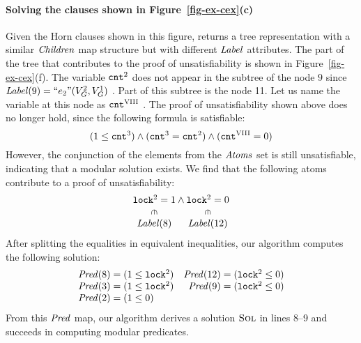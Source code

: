 \paragraph{Solving the clauses shown in Figure~\ref{fig-ex-cex}(c)}
Given the Horn clauses shown in this figure, \algMkHornTree returns a
tree representation with a similar $\mathit{Children}$ map structure but with
different $\mathit{Label}$ attributes.
The part of the tree that contributes to the proof of unsatisfiability
is shown in Figure~\ref{fig-ex-cex}(f).
The variable $\mathtt{cnt}^2$ does not appear in the subtree of the node $9$
since $\cFormulaOf{9}=\unkOf{e_2}(\GlobVars^2,\GlobVars^1)\ $. 
Part of this subtree is the node 11.
Let us name the variable at this node as $\local^{\textsc{VIII}}\ $.
The proof of unsatisfiability shown above does no longer hold, since
the following formula is satisfiable:
\[
 (1\leq\mathtt{cnt}^{3} ) \land (\mathtt{cnt}^{3} = \mathtt{cnt}^{2}) \land (\mathtt{cnt}^{\textsc{VIII}}=0)
\]
However, the conjunction of the elements from the $\mathit{Atoms}$ set is
still unsatisfiable, indicating that a modular solution exists.
We find that the following atoms contribute to a proof of unsatisfiability:
\begin{equation*}
  \begin{array}[t]{@{}c@{}}
      \lock^2=1\\
      \downin\\
      {\cFormulaOf{8}}    
    \end{array}
  \land 
  \begin{array}[t]{@{}c@{}}
      \lock^2=0\\
      \downin\\
      {\cFormulaOf{12}}
  \end{array}
\end{equation*}
After splitting the equalities in equivalent inequalities, our
algorithm computes the following solution:
\begin{equation*}  
  \begin{array}[t]{r@{\;}lr@{\;}l}
    \cInterPolOf{8} &= (1\leq\lock^{2} ) & \cInterPolOf{12} &= (\lock^{2}\leq 0 ) \\
    \cInterPolOf{3} &= (1\leq\lock^{2} ) & \cInterPolOf{9} &= (\lock^{2} \leq 0 ) \\
    \cInterPolOf{2} &= (\linfalse)  
  \end{array} 
\end{equation*}
%
From this $\mathit{Pred}$ map, our algorithm derives a solution
$\textsc{Sol}$ in lines 8--9 and succeeds in computing modular
predicates.

